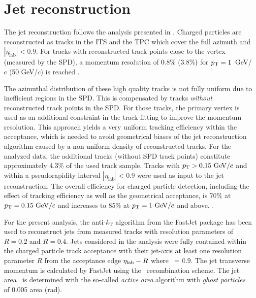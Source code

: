 
\section{Jet reconstruction}

The jet reconstruction follows the analysis presented in \cite{Adam:2015hoa,Abelev:2013kqa}. 
Charged particles are reconstructed as tracks in the ITS and the TPC which cover the full azimuth and $|\eta_\mathrm{lab}| < 0.9$. 
For tracks with reconstructed track points close to the vertex (measured by the SPD), a momentum resolution of  0.8\% (3.8\%) for $p_{\mathrm{T}} = 1$~GeV/$c$ (50 GeV/$c$) is reached \cite{Abelev:2014ffa}. 

The azimuthal distribution of these high quality tracks is not fully uniform due to inefficient regions in the SPD.
This is compensated by tracks \textit{without} reconstructed track points in the SPD. 
For those tracks, the primary vertex is used as an additional constraint in the track fitting to improve the momentum resolution. 
This approach yields a very uniform tracking efficiency within the acceptance, which is needed to avoid geometrical biases of the jet reconstruction algorithm caused by a non-uniform density of reconstructed  tracks.
For the analyzed data, the additional tracks (without SPD track points) constitute approximately 4.3\% of the used track sample. 
Tracks with $p_{\mathrm{T}} > 0.15 \mathrm{~GeV}/c$ and within a pseudorapidity interval $|\eta_\mathrm{lab}|<0.9$ were used as input to the jet reconstruction.
The overall efficiency for charged particle detection, including the effect of tracking efficiency as well as the geometrical acceptance, is 70\% at $p_{\mathrm{T}} = 0.15 \mbox{~GeV}/c$ and increases to 85\% at $p_{\mathrm{T}} = 1 \mbox{~GeV}/c$ and above. 
.

For the present analysis, the anti-$k_\mathrm{T}$ algorithm from the FastJet package \cite{Cacciari:2008gp} has been used to reconstruct jets from measured tracks with resolution parameters of $R=0.2$ and $R=0.4$.
Jets considered in the analysis were fully contained within the charged particle track acceptance with their jet-axis at least one resolution parameter $R$ from the acceptance edge $\eta_{\rm lab} - R$ where \hlab\ = 0.9.
The jet transverse momentum is calculated by FastJet using the \pt\ recombination scheme. 
The jet area \Ajet\ is determined with the so-called \emph{active area} algorithm \cite{Cacciari:2008gn} with \emph{ghost particles} of 0.005 area (rad). 

